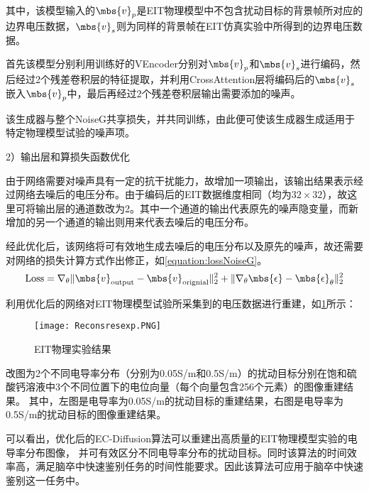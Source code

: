 其中，该模型输入的$\mbs{v}_p$是EIT物理模型中不包含扰动目标的背景帧所对应的边界电压数据，$\mbs{v}_s$则为同样的背景帧在EIT仿真实验中所得到的边界电压数据。
 
首先该模型分别利用训练好的VEncoder分别对$\mbs{v}_p$和$\mbs{v}_s$进行编码，然后经过2个残差卷积层的特征提取，并利用CrossAttention层将编码后的$\mbs{v}_s$嵌入$\mbs{v}_p$中，最后再经过2个残差卷积层输出需要添加的噪声。
 

该生成器与整个NoiseG共享损失，并共同训练，由此便可使该生成器生成适用于特定物理模型试验的噪声项。
 
2）输出层和算损失函数优化

由于网络需要对噪声具有一定的抗干扰能力，故增加一项输出，该输出结果表示经过网络去噪后的电压分布。由于编码后的EIT数据维度相同（均为$32\times 32$），故这里可将输出层的通道数改为2。其中一个通道的输出代表原先的噪声隐变量，而新增加的另一个通道的输出则用来代表去噪后的电压分布。

经此优化后，该网络将可有效地生成去噪后的电压分布以及原先的噪声，故还需要对网络的损失计算方式作出修正，如\cref{equation:lossNoiseG}。
\begin{equation}
    \centering
    \text{Loss} = \nabla_\theta\|\mbs{v}_{\text{output}} - \mbs{v}_{\text{orignial}}\|^2_2 + \|\nabla_\theta \mbs{\epsilon} - \mbs{\epsilon}_\theta\|^2_2
    \label{equation:lossNoiseG}
\end{equation}



利用优化后的网络对EIT物理模型试验所采集到的电压数据进行重建，如\cref{figure:Reconsresexp}所示：

\begin{figure}[H]
    \centering
    \texttt{[image: Reconsresexp.PNG]}
    \caption{EIT物理实验结果}
    \label{figure:Reconsresexp}
\end{figure}
改图为2个不同电导率分布（分别为0.05S/m和0.5S/m）的扰动目标分别在饱和硫酸钙溶液中3个不同位置下的电位向量（每个向量包含256个元素）的图像重建结果。
其中，左图是电导率为0.05S/m的扰动目标的重建结果，右图是电导率为0.5S/m的扰动目标的图像重建结果。

可以看出，优化后的EC-Diffusion算法可以重建出高质量的EIT物理模型实验的电导率分布图像，
并可有效区分不同电导率分布的扰动目标。同时该算法的时间效率高，满足脑卒中快速鉴别任务的时间性能要求。因此该算法可应用于脑卒中快速鉴别这一任务中。

